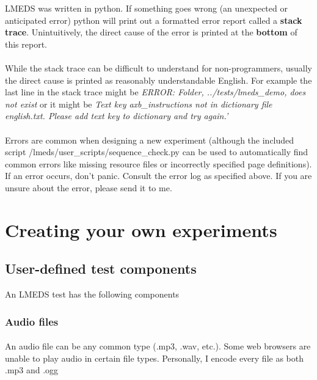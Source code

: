 \documentclass[12pt, oneside]{scrbook}   	%
\begin{document}
\begin{tcolorbox}[breakable,colback=white,colframe=red,width=\dimexpr\textwidth+12mm\relax,enlarge left by=-6mm]
LMEDS was written in python.  If something goes wrong (an unexpected or anticipated error) python will print out a formatted error report called a \textbf{stack trace}.  Unintuitively, the direct cause of the error is printed at the \textbf{bottom} of this report.  

\paragraph{}
While the stack trace can be difficult to understand for non-programmers, usually the direct cause is printed as reasonably understandable English.  For example the last line in the stack trace might be \textit{ERROR: Folder, ../tests/lmeds\_demo, does not exist} or it might be \textit{Text key axb\_instructions not in dictionary file english.txt.  Please add text key to dictionary and try again.'}

\paragraph{}
Errors are common when designing a new experiment (although the included script /lmeds/user\_scripts/sequence\_check.py can be used to automatically find common errors like missing resource files or incorrectly specified page definitions).  If an error occurs, don't panic.  Consult the error log as specified above.  If you are unsure about the error, please send it to me.

\end{tcolorbox}

\section{Creating your own experiments}

\subsection{User-defined test components}

An LMEDS test has the following components

\subsubsection{Audio files}

\paragraph{}
An audio file can be any common type (.mp3, .wav, etc.).   Some web browsers are unable to play audio in certain file types.  Personally, I encode every file as both .mp3 and .ogg
\end{document}
